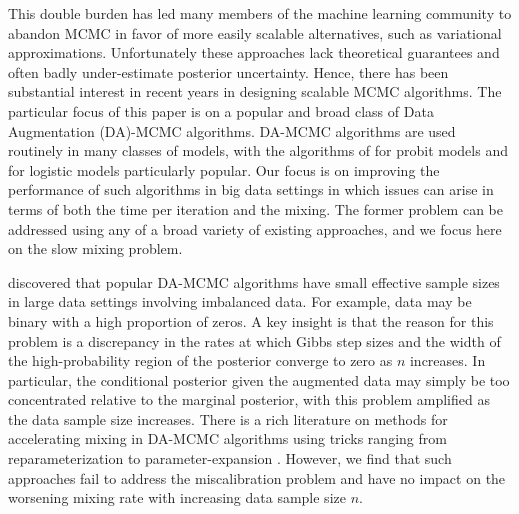 \documentclass[12pt]{article}
\begin{document}
{This double burden has led many members of the machine learning community to abandon MCMC in favor of more easily scalable alternatives, such as variational approximations. Unfortunately these approaches lack theoretical guarantees and often badly under-estimate posterior uncertainty.  Hence, there has been substantial interest in recent years in designing scalable MCMC algorithms.  The particular focus of this paper is on a popular and broad class of Data Augmentation (DA)-MCMC algorithms.  DA-MCMC algorithms are used routinely in many classes of models, with the algorithms of \cite{albert1993bayesian} for probit models and \cite{polson2013bayesian} for logistic models particularly popular.  Our focus is on improving the performance of such algorithms in big data settings in which issues can arise in terms of both the time per iteration and the mixing.  The former problem can be addressed using any of a broad variety of existing approaches, and we focus here on the slow
mixing problem.}

{ \cite{johndrow2016inefficiency} discovered that popular DA-MCMC algorithms have small effective sample sizes in large data settings involving imbalanced data.  For example, data may be binary with a high proportion of zeros.  A key insight is that the reason for this problem is a discrepancy in the rates at which Gibbs step sizes and the width of the high-probability region of the posterior converge to zero as $n$ increases.  In particular, the conditional posterior given the augmented data may simply be too concentrated relative to the marginal posterior, with this problem amplified as the data sample size increases.  There is a rich literature on methods for accelerating mixing in DA-MCMC algorithms using tricks ranging from reparameterization to parameter-expansion \citep{liu1999parameter,meng1999seeking,papaspiliopoulos2007general}.  However, we find that such approaches fail to address the miscalibration problem and have no impact on the worsening mixing rate with increasing data sample size $n$.}
\end{document}
